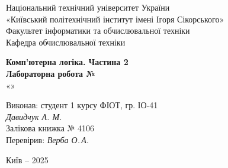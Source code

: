 \documentclass[12pt,a4paper]{article}
\begin{document}
    \begin{titlepage}

        \thispagestyle{empty}
        \begin{center}
        \large
        Національний технічний університет України\\
        «Київський політехнічний інститут імені Ігоря Сікорського»\\[1em]
        Факультет інформатики та обчислювальної техніки\\
        Кафедра обчислювальної техніки
        \end{center}

        \vfill

        \begin{center}
        \textbf{\LARGE Комп'ютерна логіка. Частина 2}\\[2em]
        \textbf{\Large Лабораторна робота №}\\
        «» 
        \end{center}

        \vfill

        \begin{flushright}
        Виконав: студент 1 курсу ФІОТ, гр. ІО-41\\
        \textit{Давидчук А. М.}\\
        Залікова книжка № 4106\\[1em]
        Перевірив: \textit{Верба О.\,А.}
        \end{flushright}

        \vfill

        \begin{center}
        Київ -- 2025
        \end{center}

    \end{titlepage}

\end{document}

